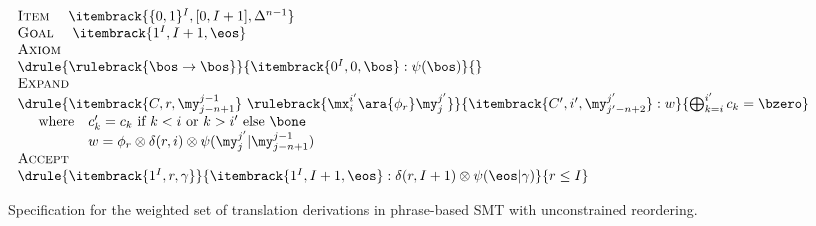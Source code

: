 
\newcommand{\fullpbwhere}{
\begin{array}{l l }
\text{where} & c_k' = c_k \text{ if } k < i \text{ or } k > i' \text{ else } \bone \\
& w = \phi_r\otimes\delta(r, i)\otimes\psi(\my_j^{j'}|\my_{j-n+1}^{j-1}) \\
\end{array}
}

\begin{figure}[t] \small \centering
\begin{math} %
 \left. 
  \begin{array}{l}
    \textsc{Item} ~~~~ {\itembrack{\{0,1\}^I,[0, I+1],\Delta^{n-1}}} \\
    \textsc{Goal} ~~~~ {\itembrack{1^I,I+1,\eos}} \\
    \textsc{Axiom} \\ %
	\drule{\rulebrack{\bos \rightarrow \bos}}{\itembrack{0^I, 0, \bos}:\psi(\bos)}{} \\
    \textsc{Expand} \\ %
	\drule{\itembrack{C, r, \my_{j-n+1}^{j-1}} ~ \rulebrack{\mx_i^{i'} \ara{\phi_r} \my_j^{j'}}}{\itembrack{C', i', \my_{j'-n+2}^{j'}}:w}{\bigoplus_{k=i}^{i'} c_k = \bzero} \\ 
	~~~ \fullpbwhere \\
    \textsc{Accept} \\
	\drule{\itembrack{1^I, r, \gamma}}{\itembrack{1^I, I+1, \eos}:\delta(r, I+1)\otimes\psi(\eos|\gamma)}{r \leq I} \\ 	
  \end{array} 
\right.
\end{math}
\caption{Specification for the weighted set of translation derivations in phrase-based \acs{SMT} with unconstrained reordering.}\label{fig:fullpb}
\end{figure}

